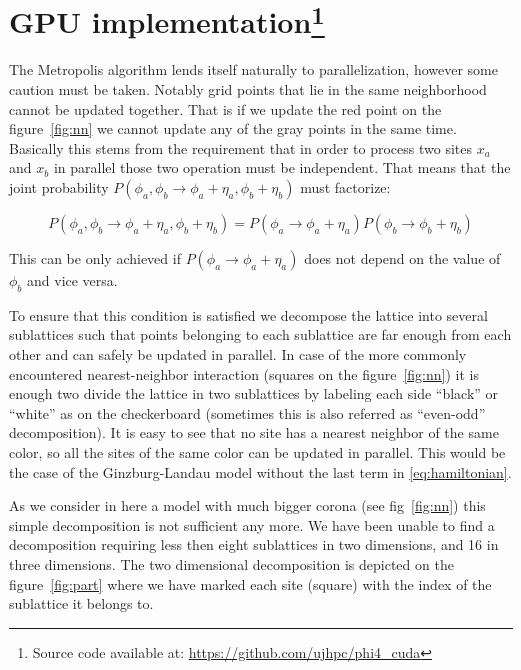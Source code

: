 \documentclass[a4paper]{llncs}
\begin{document}
\section[gpu]{GPU implementation\footnote{Source code available at:
\url{https://github.com/ujhpc/phi4_cuda}}}

The Metropolis algorithm lends itself naturally to parallelization, however
some caution must be taken. Notably grid points that lie in the same
neighborhood cannot be updated together. That is if we update the red point on
the figure~\ref{fig:nn} we cannot update any of the gray points in the same
time. Basically this stems from the requirement that in order to process two
sites $x_a$ and $x_b$ in parallel those two operation must be independent. That
means that the joint probability
$P(\phi_a,\phi_b\rightarrow\phi_a+\eta_a,\phi_b+\eta_b)$ must factorize:

\begin{equation}
P(\phi_a,\phi_b\rightarrow\phi_a+\eta_a,\phi_b+\eta_b)
=P(\phi_a\rightarrow\phi_a+\eta_a)P(\phi_b\rightarrow\phi_b+\eta_b)
\end{equation}

This can be only achieved if $P(\phi_a\rightarrow\phi_a+\eta_a)$ does
not depend on the value of $\phi_b$ and vice versa.

To ensure that this condition is satisfied we decompose the lattice into
several sublattices such that points belonging to each sublattice are far
enough from each other and can safely be updated in parallel. In case of the
more commonly encountered nearest-neighbor interaction (squares on the
figure~\ref{fig:nn}) it is enough two divide the lattice in two sublattices by
labeling each side ``black'' or ``white'' as on the checkerboard (sometimes
this is also referred as ``even-odd'' decomposition)\cite{Checkboard}. It is
easy to see that no site has a nearest neighbor of the same color, so all the
sites of the same color can be updated in parallel. This would be the case of
the Ginzburg-Landau model without the last term in \eqref{eq:hamiltonian}.

As we consider in here a model with much bigger corona (see fig~\ref{fig:nn})
this simple decomposition is not sufficient any more. We have been unable to
find a decomposition requiring less then eight sublattices in two dimensions,
and 16 in three dimensions. The two dimensional decomposition is depicted on
the figure~\ref{fig:part} where we have marked each site (square) with the
index of the sublattice it belongs to.
\end{document}
